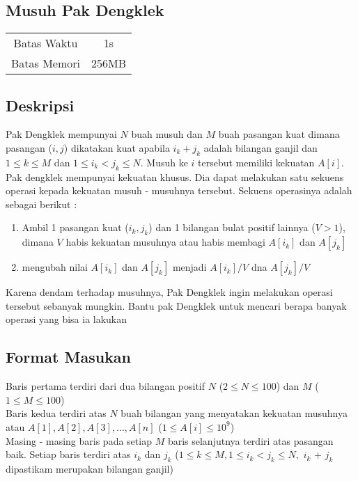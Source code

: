 \documentclass{article}
\begin{document}
\begin{center}

    
    \section*{Musuh Pak Dengklek} %

    \begin{tabular}{ | c c | }
        \hline
        Batas Waktu  & 1s \\    %
        Batas Memori & 256MB \\  %
        \hline
    \end{tabular}
\end{center}

\subsection*{Deskripsi}
Pak Dengklek mempunyai $N$ buah musuh dan $M$ buah pasangan kuat dimana pasangan ($i,j$) dikatakan kuat apabila $i_k + j_k$ adalah bilangan ganjil dan $1 \leq k \leq M$ dan $1 \leq i_k < j_k \leq N$. Musuh ke $i$ tersebut memiliki kekuatan $A[i]$. Pak dengklek mempunyai kekuatan khusus. Dia dapat melakukan satu sekuens operasi kepada kekuatan  musuh - musuhnya tersebut. Sekuens operasinya adalah sebagai berikut :
\begin{enumerate}
    \item Ambil 1 pasangan kuat ($i_k, j_k$) dan 1 bilangan bulat positif lainnya ($V > 1$), dimana $V$ habis kekuatan musuhnya atau habis membagi $A[i_k]$ dan $A[j_k]$
    \item mengubah nilai $A[i_k]$ dan $A[j_k]$ menjadi  $A[i_k]/V$ dna $A[j_k]/V$
\end{enumerate}
Karena dendam terhadap musuhnya, Pak Dengklek ingin melakukan operasi tersebut sebanyak mungkin. Bantu pak Dengklek untuk mencari berapa banyak operasi yang bisa ia lakukan
\subsection*{Format Masukan}

Baris pertama terdiri dari dua bilangan positif $N$ ($2 \leq N \leq 100$) dan $M$ ($1 \leq M \leq 100$)\\
Baris kedua terdiri atas $N$ buah bilangan yang menyatakan kekuatan musuhnya atau $A[1], A[2], A[3], ... ,A[n]$ ($1 \leq A[i] \leq 10^9$)\\
Masing - masing baris pada setiap $M$ baris selanjutnya terdiri atas pasangan baik. Setiap baris terdiri atas $i_k$ dan $j_k$ ($1 \leq k \leq M,1 \leq i_k < j_k \leq N,$ $i_k$ + $j_k$ dipastikam  merupakan bilangan ganjil) 
\end{document}

